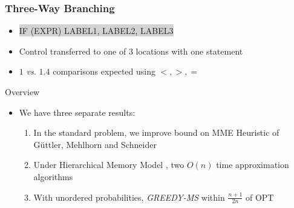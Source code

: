 \documentclass{beamer}
\theoremstyle{plain}
\begin{document}
\begin{frame} \frametitle{Three-Way Branching}

\begin{center}
\end{center}

\begin{itemize}



\item {} %
\colorbox{lightgrey}{ \selectfont \uppercase{IF (expr) label1, label2, label3} } 

\item Control transferred to one of $3$ locations with one statement

\item $1$ \textit{vs.} $1.4$ comparisons expected using $<, >, =$
\end{itemize}
\end{frame}


\begin{frame}{Overview}

\begin{itemize}

\item We have three separate results:
\begin{enumerate}
\item In the standard problem, we improve bound on MME Heuristic of G{\"u}ttler, Mehlhorn and Schneider \cite{guttler1980binary}

\item Under Hierarchical Memory Model \cite{aggarwal1987model}, two $O(n)$ time approximation algorithms

\item With unordered probabilities, \textit{GREEDY-MS} within $\frac{n+1}{2n}$ of OPT
\end{enumerate}
\end{itemize}
\end{frame}
\end{document}
